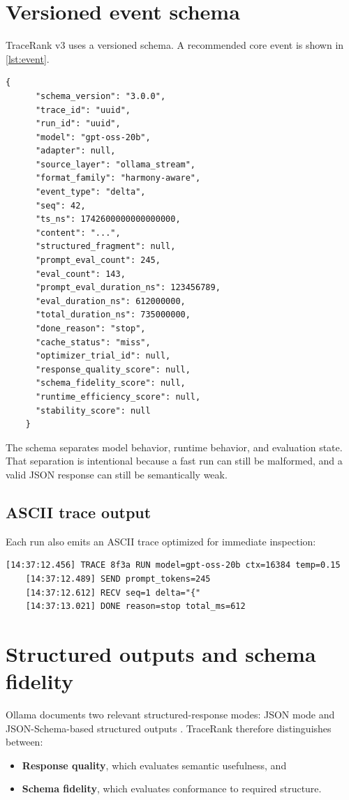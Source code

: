     \section{Versioned event schema}
    TraceRank v3 uses a versioned schema. A recommended core event is shown in \cref{lst:event}.
    
    \begin{lstlisting}[style=tracerank,caption={Core TraceRank event schema.},label={lst:event}]
    {
      "schema_version": "3.0.0",
      "trace_id": "uuid",
      "run_id": "uuid",
      "model": "gpt-oss-20b",
      "adapter": null,
      "source_layer": "ollama_stream",
      "format_family": "harmony-aware",
      "event_type": "delta",
      "seq": 42,
      "ts_ns": 1742600000000000000,
      "content": "...",
      "structured_fragment": null,
      "prompt_eval_count": 245,
      "eval_count": 143,
      "prompt_eval_duration_ns": 123456789,
      "eval_duration_ns": 612000000,
      "total_duration_ns": 735000000,
      "done_reason": "stop",
      "cache_status": "miss",
      "optimizer_trial_id": null,
      "response_quality_score": null,
      "schema_fidelity_score": null,
      "runtime_efficiency_score": null,
      "stability_score": null
    }
    \end{lstlisting}
    
    The schema separates model behavior, runtime behavior, and evaluation state. That separation is intentional because a fast run can still be malformed, and a valid JSON response can still be semantically weak.
    
    \subsection{ASCII trace output}
    Each run also emits an ASCII trace optimized for immediate inspection:
    \begin{lstlisting}[style=tracerank,caption={Illustrative ASCII trace.}]
    [14:37:12.456] TRACE 8f3a RUN model=gpt-oss-20b ctx=16384 temp=0.15
    [14:37:12.489] SEND prompt_tokens=245
    [14:37:12.612] RECV seq=1 delta="{"
    [14:37:13.021] DONE reason=stop total_ms=612
    \end{lstlisting}
    
    \section{Structured outputs and schema fidelity}
    Ollama documents two relevant structured-response modes: JSON mode and JSON-Schema-based structured outputs \cite{ollama_structured}. TraceRank therefore distinguishes between:
    \begin{itemize}
      \item \textbf{Response quality}, which evaluates semantic usefulness, and
      \item \textbf{Schema fidelity}, which evaluates conformance to required structure.
    \end{itemize}
    
